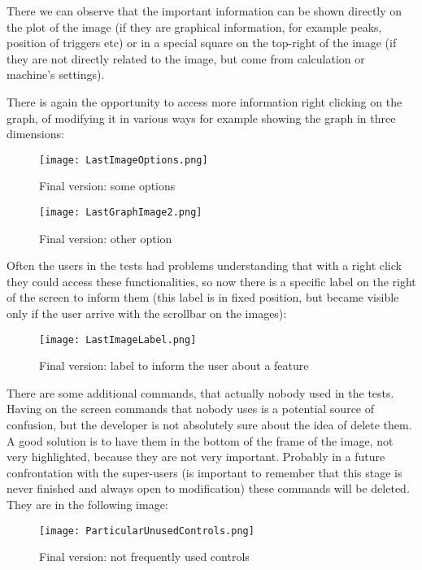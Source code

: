 There we can observe that the important information can be shown directly on the plot of the image (if they are graphical information, for example peaks, position of triggers etc) or in a special square on the top-right of the image (if they are not directly related to the image, but come from calculation or machine's settings).

\newpage

There is again the opportunity to access more information right clicking on the graph, of modifying it in various ways for example showing the graph in three dimensions: 

\begin{figure}[H]
\centering
\texttt{[image: LastImageOptions.png]} 
\caption{Final version: some options}
\end{figure}  

\begin{figure}[H]
\centering
\texttt{[image: LastGraphImage2.png]} 
\caption{Final version: other option}
\end{figure}  

Often the users in the tests had problems understanding that with a right click they could access these functionalities, so now there is a specific label on the right of the screen to inform them (this label is in fixed position, but became visible only if the user arrive with the scrollbar on the images):

\begin{figure}[H]
\centering
\texttt{[image: LastImageLabel.png]} 
\caption{Final version: label to inform the user about a feature}
\end{figure} 

There are some additional commands, that actually nobody used in the tests. Having on the screen commands that nobody uses is a potential source of confusion, but the developer is not absolutely sure about the idea of delete them. A good solution is to have them in the bottom of the frame of the image, not very highlighted, because they are not very important. Probably in a future confrontation with the super-users (is important to remember that this stage is never finished and always open to modification) these commands will be deleted.
They are in the following image:

\begin{figure}[H]
\centering
\texttt{[image: ParticularUnusedControls.png]} 
\caption{Final version: not frequently used controls}
\end{figure}  